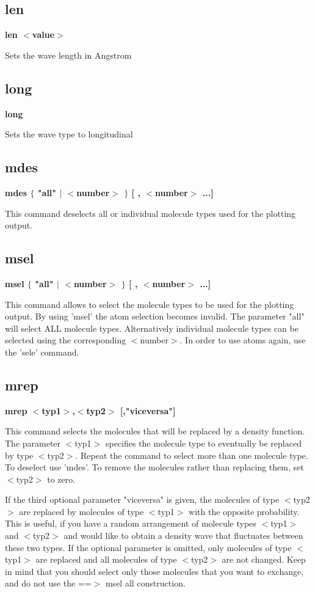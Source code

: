 \subsection*{len}
{\bf len $ <$value$> $ \par }
\par
\vspace{3pt}
Sets the wave length in Angstrom 
\subsection*{long}
{\bf long \par }
\par
\vspace{3pt}
Sets the wave type to longitudinal 
\subsection*{mdes}
{\bf mdes $ \{$ "all" $| $ $ <$number$> $ $\} $ [ , $ <$number$> $ ...] \par }
\par
\vspace{3pt}
This command deselects all or individual molecule types used for 
the plotting output. 
\subsection*{msel}
{\bf msel $ \{$ "all" $| $ $ <$number$> $ $\} $ [ , $ <$number$> $ ...] \par }
\par
\vspace{3pt}
This command allows to select the molecule types to be used for 
the plotting output. By using 'msel' the atom selection becomes 
invalid. The parameter "all" will select ALL molecule types. 
Alternatively individual molecule types can be selected using the 
corresponding $ <$number$> $. In order to use atoms again, use the 'sele' 
command. 
\subsection*{mrep}
{\bf mrep $ <$typ1$> $,$ <$typ2$> $ [,"viceversa"] \par }
\par
\vspace{3pt}
This command selects the molecules that will be replaced by a density 
function. The parameter $ <$typ1$> $ specifies the molecule type to 
eventually be replaced by type $ <$typ2$> $. Repeat the command to select 
more than one molecule type. To deselect use 'mdes'. To remove the 
molecules rather than replacing them, set $ <$typ2$> $ to zero. 
\par
If the third optional parameter "viceversa" is given, the molecules 
of type $ <$typ2$> $ are replaced by molecules of type $ <$typ1$> $ with the 
opposite probability. 
This is useful, if you have a random arrangement of molecule types 
$ <$typ1$> $ and $ <$typ2$> $ and would like to obtain a density wave that 
fluctuates between these two types. If the optional parameter is 
omitted, only molecules of type $ <$typ1$> $ are replaced and all 
molecules of type $ <$typ2$> $ are not changed. 
Keep in mind that you should select only those molecules that you 
want to exchange, and do not use the ==$> $ msel all construction. 
